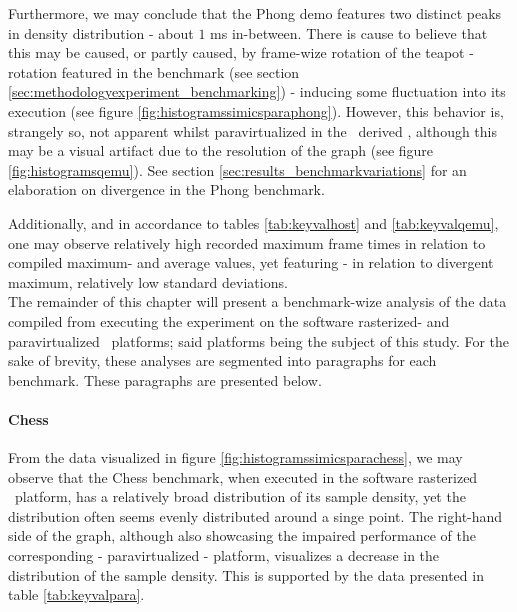 Furthermore, we may conclude that the Phong demo features two distinct peaks in density distribution - about $1$ ms in-between.
There is cause to believe that this may be caused, or partly caused, by frame-wize rotation of the teapot - rotation featured in the benchmark (see section \ref{sec:methodologyexperiment_benchmarking}) - inducing some fluctuation into its execution (see figure \ref{fig:histogramssimicsparaphong}).
However, this behavior is, strangely so, not apparent whilst paravirtualized in the \dvttermqemu\ derived \dvttermandroidemulator , although this may be a visual artifact due to the resolution of the graph (see figure \ref{fig:histogramsqemu}).
See section \ref{sec:results_benchmarkvariations} for an elaboration on divergence in the Phong benchmark.

Additionally, and in accordance to tables \ref{tab:keyvalhost} and \ref{tab:keyvalqemu}, one may observe relatively high recorded maximum frame times in relation to compiled maximum- and average values, yet featuring - in relation to divergent maximum, relatively low standard deviations.\\

\noindent
The remainder of this chapter will present a benchmark-wize analysis of the data compiled from executing the experiment on the software rasterized- and paravirtualized \dvttermsimics\ platforms; said platforms being the subject of this study.
For the sake of brevity, these analyses are segmented into paragraphs for each benchmark.
These paragraphs are presented below.













\paragraph{Chess}
\label{par:results_chess}
From the data visualized in figure \ref{fig:histogramssimicsparachess}, we may observe that the Chess benchmark, when executed in the software rasterized \dvttermsimics\ platform, has a relatively broad distribution of its sample density, yet the distribution often seems evenly distributed around a singe point. %
The right-hand side of the graph, although also showcasing the impaired performance of the corresponding - paravirtualized - platform, visualizes a decrease in the distribution of the sample density.
This is supported by the data presented in table \ref{tab:keyvalpara}.

